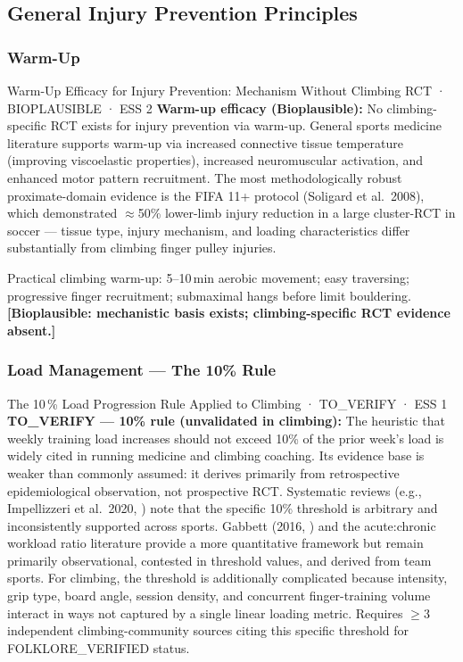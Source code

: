 \subsection{General Injury Prevention Principles}
\label{subsec:prevention}

\subsubsection{Warm-Up}

\begin{bioplausbox}{Warm-Up Efficacy for Injury Prevention: Mechanism Without Climbing RCT · BIOPLAUSIBLE · ESS 2}
\textbf{Warm-up efficacy (Bioplausible):} No climbing-specific RCT exists for injury prevention via warm-up. General sports medicine literature supports warm-up via increased connective tissue temperature (improving viscoelastic properties), increased neuromuscular activation, and enhanced motor pattern recruitment. The most methodologically robust proximate-domain evidence is the FIFA 11+ protocol (Soligard et al.\ 2008), which demonstrated $\approx$50\% lower-limb injury reduction in a large cluster-RCT in soccer --- tissue type, injury mechanism, and loading characteristics differ substantially from climbing finger pulley injuries.

Practical climbing warm-up: 5--10\,min aerobic movement; easy traversing; progressive finger recruitment; submaximal hangs before limit bouldering. \textbf{[Bioplausible: mechanistic basis exists; climbing-specific RCT evidence absent.]}
\end{bioplausbox}

\subsubsection{Load Management --- The 10\% Rule}

\begin{toverifybox}{The 10\,\% Load Progression Rule Applied to Climbing · TO\_VERIFY · ESS 1}
\textbf{TO\_VERIFY --- 10\% rule (unvalidated in climbing):} The heuristic that weekly training load increases should not exceed 10\% of the prior week's load is widely cited in running medicine and climbing coaching. Its evidence base is weaker than commonly assumed: it derives primarily from retrospective epidemiological observation, not prospective RCT. Systematic reviews (e.g., Impellizzeri et al.\ 2020, \cite{IWCE20}) note that the specific 10\% threshold is arbitrary and inconsistently supported across sports. Gabbett (2016, \cite{GAB16}) and the acute:chronic workload ratio literature provide a more quantitative framework but remain primarily observational, contested in threshold values, and derived from team sports. For climbing, the threshold is additionally complicated because intensity, grip type, board angle, session density, and concurrent finger-training volume interact in ways not captured by a single linear loading metric. Requires $\geq$3 independent climbing-community sources citing this specific threshold for FOLKLORE\_VERIFIED status.
\end{toverifybox}

